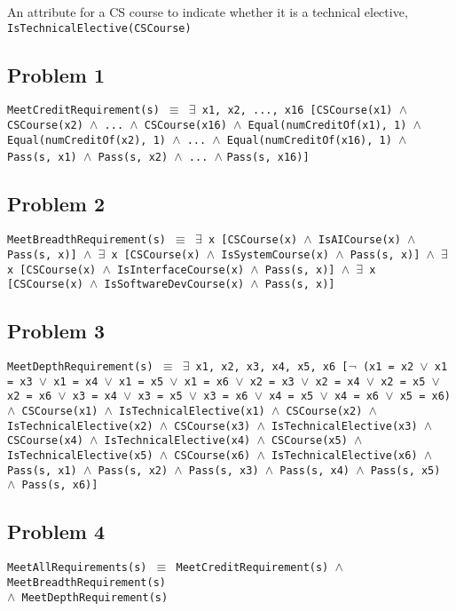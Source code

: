 \documentclass[11pt]{article}
\begin{document}
An attribute for a CS course to indicate whether it is a technical elective, \texttt{IsTechnicalElective(CSCourse)}

\subsection{Problem 1}
\texttt{MeetCreditRequirement(s) $\equiv$ $\exists$ x1, x2, ..., x16 [CSCourse(x1) $\land$ CSCourse(x2) $\land$ ... $\land$ CSCourse(x16) $\land$ Equal(numCreditOf(x1), 1) $\land$ Equal(numCreditOf(x2), 1) $\land$ ... $\land$ Equal(numCreditOf(x16), 1) $\land$ Pass(s, x1) $\land$ Pass(s, x2) $\land$ ... $\land$} \texttt{Pass(s, x16)]}

\subsection{Problem 2}
\texttt{MeetBreadthRequirement(s) $\equiv$ $\exists$ x [CSCourse(x) $\land$ IsAICourse(x) $\land$ Pass(s, x)] $\land$ $\exists$ x [CSCourse(x) $\land$ IsSystemCourse(x) $\land$ Pass(s, x)] $\land$ $\exists$ x [CSCourse(x) $\land$ IsInterfaceCourse(x) $\land$ Pass(s, x)] $\land$ $\exists$ x [CSCourse(x) $\land$ IsSoftwareDevCourse(x) $\land$ Pass(s, x)]}

\subsection{Problem 3}

\texttt{MeetDepthRequirement(s) $\equiv$ $\exists$ x1, x2, x3, x4, x5, x6 [$\neg$ (x1 = x2 $\lor$ x1 = x3 $\lor$ x1 = x4 $\lor$ x1 = x5 $\lor$ x1 = x6 $\lor$ x2 = x3 $\lor$ x2 = x4 $\lor$ x2 = x5 $\lor$ x2 = x6 $\lor$ x3 = x4 $\lor$ x3 = x5 $\lor$ x3 = x6 $\lor$ x4 = x5 $\lor$ x4 = x6 $\lor$ x5 = x6) $\land$ CSCourse(x1) $\land$ IsTechnicalElective(x1) $\land$ CSCourse(x2) $\land$ IsTechnicalElective(x2) $\land$ CSCourse(x3) $\land$ IsTechnicalElective(x3) $\land$ CSCourse(x4) $\land$ IsTechnicalElective(x4) $\land$ CSCourse(x5) $\land$ IsTechnicalElective(x5) $\land$ CSCourse(x6) $\land$ IsTechnicalElective(x6) $\land$ Pass(s, x1) $\land$ Pass(s, x2) $\land$ Pass(s, x3) $\land$ Pass(s, x4) $\land$ Pass(s, x5) $\land$ Pass(s, x6)]}



\subsection{Problem 4}
\texttt{MeetAllRequirements(s) $\equiv$ MeetCreditRequirement(s) $\land$ MeetBreadthRequirement(s)} \\\texttt{$\land$ MeetDepthRequirement(s)}
\end{document}
